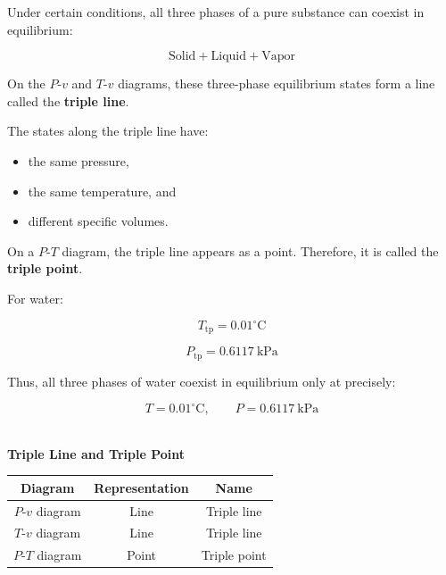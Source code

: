 \documentclass[12pt]{article}
\begin{document}
Under certain conditions, all three phases of a pure substance can coexist in equilibrium:

\begin{equation*}
\boxed{\text{Solid}+\text{Liquid}+\text{Vapor}}
\end{equation*}

On the $P$-$v$ and $T$-$v$ diagrams, these three-phase equilibrium states form a line called the \textbf{triple line}.

The states along the triple line have:
\begin{itemize}
    \item the same pressure,
    \item the same temperature, and
    \item different specific volumes.
\end{itemize}

On a $P$-$T$ diagram, the triple line appears as a point. Therefore, it is called the \textbf{triple point}.

For water:

\begin{equation*}
T_{\mathrm{tp}}=0.01^\circ\mathrm{C}
\end{equation*}

\begin{equation*}
P_{\mathrm{tp}}=0.6117~\mathrm{kPa}
\end{equation*}

Thus, all three phases of water coexist in equilibrium only at precisely:

\begin{equation*}
\boxed{
T=0.01^\circ\mathrm{C},
\qquad
P=0.6117~\mathrm{kPa}
}
\end{equation*}

\textbf{\\ Triple Line and Triple Point}

\begin{center}
    \begin{tabular}{|c|c|c|}
        \hline
        \textbf{Diagram} & \textbf{Representation} & \textbf{Name} \\
        \hline
        $P$-$v$ diagram & Line & Triple line \\
        \hline
        $T$-$v$ diagram & Line & Triple line \\
        \hline
        $P$-$T$ diagram & Point & Triple point \\
        \hline
    \end{tabular}
\end{center}
\end{document}
